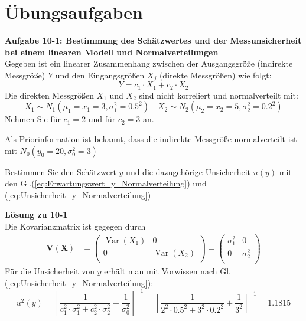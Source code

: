 \begin{comment}
[y_KMsort, km_sort] = sort(y_KM);
p_2 = p_KM_2(km_sort);
diff_y = diff(y_KMsort);
mid_p_KM_2 = (p_2(2:nKM)+p_2(1:nKM-1))*0.5;
iuse = find(diff_y>0);
meandiff = mean(diff_y(iuse))
diff_y = diff_y/meandiff;
pdf = mid_p_KM_2(iuse)./diff_y(iuse);
figure(120);
plot(diff_y);
figure(121);
plot(y_KMsort(iuse),pdf);
sumpdf = 5.2e6; max(pdf)
figure(100);
plot( y_KMsort(iuse), max(posterior1)*pdf/sumpdf, 'g.',...
y, posterior1,'k-',...
y, posterior2,'r--',...
y, posterior3,'b-','linewidth',2);
xlabel('indirekte Groesse / Einheit', 'fontsize', 14);
ylabel('pdf', 'fontsize', 14);
legend('Dirac: Weise/Wuebbler','Geraet genau, Messobj schlecht',...
'beides ungenau','Geraet ungenau, Modell duenner Peak')
set(gcf, 'PaperUnits', 'centimeters');
x_width=15 ;y_width= 8;
set(gcf, 'PaperPosition', [0 0 x_width y_width]);
print '-dpng' Posterior_all.png
\end{verbatim}
\end{comment}
\newpage
\section{Übungsaufgaben}
\textbf{Aufgabe 10-1: Bestimmung des Schätzwertes und der Messunsicherheit bei
einem linearen Modell und Normalverteilungen}\\
Gegeben ist ein linearer Zusammenhang zwischen der Ausgangsgröße (indirekte
Messgröße) $Y$ und den Eingangsgrößen $X_j$ (direkte Messgrößen) wie folgt:
\[
Y = c_1 \cdot X_1 + c_2 \cdot X_2
\]
Die direkten Messgrößen $X_1$ und $X_2$ sind nicht korreliert und 
normalverteilt mit: 
\[
X_1 \sim N_{1}(\mu_1 =x_1=3,\sigma_1^2= 0.5^2 ) 
\quad X_2 \sim N_{2}(\mu_2=x_2= 5,\sigma_2^2=0.2^2 )
\]
Nehmen Sie für $c_1 = 2$ und für $c_2 = 3$ an. 

Als Priorinformation ist bekannt, dass die indirekte Messgröße
normalverteilt ist mit \newline  $N_0(y_0=20,\sigma_0^2=3)$

Bestimmen Sie den Schätzwert $y$ und die dazugehörige Unsicherheit 
$u(y)$ mit den Gl.(\ref{eq:Erwartungswert_y_Normalverteilung}) und 
(\ref{eq:Unsicherheit_y_Normalverteilung})

\textbf{Lösung zu 10-1} \\
Die Kovarianzmatrix ist gegegen durch 
\begin{align}
\boldsymbol{V(X)} &= 
\begin{pmatrix}
\operatorname{Var}(X_1) & 0 \\
0 & \operatorname{Var}(X_2)  \\
\end{pmatrix}
= 
\begin{pmatrix}
\sigma_1^2 & 0 \\
0 & \sigma_2^2 \\
\end{pmatrix}
\end{align}
Für die Unsicherheit von $y$ erhält man mit Vorwissen nach Gl.	(\ref{eq:Unsicherheit_y_Normalverteilung}):
\[
u^2(y) = \left[ \frac{1}{c_1^2\cdot \sigma_1^2 + c_2^2\cdot \sigma_2^2} 
+ \frac{1}{\sigma_0^2} \right]^{-1}
 = \left[ \frac{1}{2^2\cdot 0.5^2 + 3^2\cdot 0.2^2} 
+ \frac{1}{3^2} \right]^{-1} = 1.1815
\]

